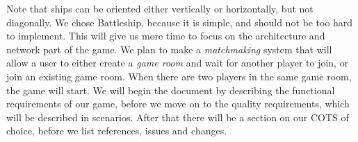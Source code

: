 Note that ships can be oriented either vertically or horizontally, but not diagonally.
\newline
\newline
We chose Battleship, because it is simple, and should not be too hard to implement. This will give us more time to focus on the architecture and network part of the game. We plan to make a \textit{matchmaking} system that will allow a user to either create a \textit{game room} and wait for another player to join, or join an existing game room. When there are two players in the same game room, the game will start.
\newline
\newline
We will begin the document by describing the functional requirements of our game, before we move on to the quality requirements, which will be described in scenarios. After that there will be a section on our COTS of choice, before we list references, issues and changes.